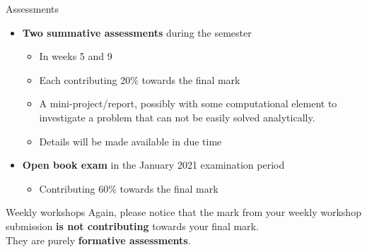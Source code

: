%
%
%

\begin{frame}{Assessments}

  \begin{itemize}
      \item {\bf Two summative assessments} during the semester
      \begin{itemize}
         \item In weeks 5 and 9
         \item Each contributing 20\% towards the final mark
         \item A mini-project/report,
               possibly with some computational element
               to investigate a problem that can not be easily solved analytically.
         \item Details will be made available in due time
      \end{itemize}
      \vspace{0.3cm}
      \item {\bf Open book exam} in the January 2021 examination period
      \begin{itemize}
         \item Contributing 60\% towards the final mark
      \end{itemize}
  \end{itemize}

  \vspace{0.3cm}

  \begin{block001}{Weekly workshops}
    Again, please notice that the mark from your weekly workshop
    submission {\bf is not contributing} towards your final mark.\\
    They are purely {\bf formative assessments}.
  \end{block001}


\end{frame}

%
%
%

